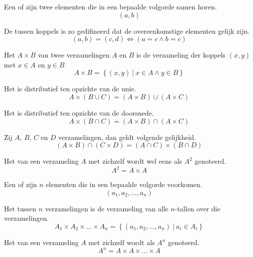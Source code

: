 \documentclass[main.tex]{subfiles}
\begin{document}
\begin{de}
  Een  of  zijn twee elementen die in een bepaalde volgorde samen horen.
  \[ (a,b) \]
\end{de}

\begin{de}
  De  tussen koppels is zo gedifineerd dat de overeenkomstige elementen gelijk zijn.
  \[ (a,b) = (c,d) \Leftrightarrow (a = c \wedge b = c) \] 
\end{de}

\begin{de}
  Het  $A \times B$ van twee verzamelingen $A$ en $B$ is de verzameling der koppels $(x,y)$ met $x \in A$ en $y \in B$
  \[ A \times B = \left\{ (x,y) \ |\ x \in A \wedge y \in B \right\} \]
\end{de}

\begin{st}
  Het  is distributief ten opzichte van de unie.
  \[ A \times (B \cup C) = (A \times B) \cup (A \times C) \] 
\end{st}
\begin{st}
  Het  is distributief ten opzichte van de doorsnede.
  \[ A \times (B \cap C) = (A \times B) \cap (A \times C) \] 
\end{st}

\begin{st}
  Zij $A$, $B$, $C$ en $D$ verzamelingen, dan geldt volgende gelijkheid.
  \[ (A \times B) \cap (C \times D) = (A \cap C) \times (B \cap D) \]
\end{st}

\begin{de}
  Het  van een verzameling $A$ met zichzelf wordt wel eens als $A^{2}$ genoteerd.
  \[ A^{2} = A \times A \]
\end{de}

\begin{de}
  Een  of  zijn $n$ elementen die in een bepaalde volgorde voorkomen.
  \[ (a_{1}, a_{2}, \ldots, a_{n}) \]
\end{de}

\begin{de}
  Het  tussen $n$ verzamelingen is de verzameling van alle $n$-tallen over die verzamelingen.
  \[ A_{1} \times A_{2} \times \ldots \times A_{n} = \left\{ (a_{1}, a_{2}, \ldots, a_{n}) \ |\ a_{i} \in A_{i} \right\}\]
\end{de}

\begin{de}
  Het  van een verzameling $A$ met zichzelf wordt als $A^{n}$ genoteerd.
  \[ A^{n} = A \times A \times \ldots \times A\]
\end{de}
\end{document}
